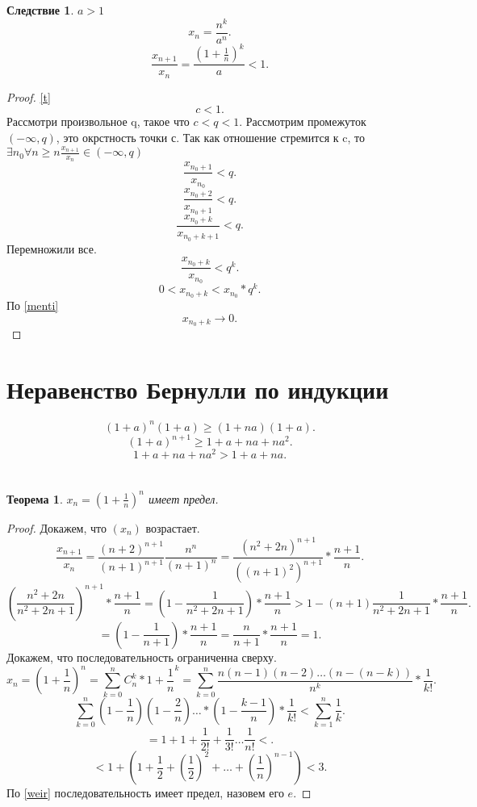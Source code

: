 \documentclass[a4paper]{scrartcl}
\newtheorem{theorem}{Теорема}
\newtheorem{corollary}{Следствие}[theorem]
\begin{document}
\begin{corollary}
	$a > 1$
	\[
		x_n = \frac{n^k}{a^n}
		.\]
	\[
		\frac{x_{n+1}}{x_n} = \frac{(1 + \frac{1}{n})^k}{a} < 1
		.\]
\end{corollary}
\begin{proof}\ref{t}
	\[
		c < 1
		.\]
	Рассмотри произвольное q, такое что $c < q < 1$. Рассмотрим промежуток  $(-\infty,q)$, это окрстность точки с. Так как отношение стремится к c, то  $\exists  n_0 \forall  n\ge n \frac{x_{n + 1}}{x_n}
		\in (-\infty,q)$
	\[
		\frac{x_{n_0 + 1}}{x_{n_0}} < q
		.\]
	\[
		\frac{x_{n_0 + 2}}{x_{n_0 + 1}} < q
		.\]
	\[
		\frac{x_{n_0 + k}}{x_{n_0 + k + 1}} < q
		.\]
	Перемножили все.
	\[
		\frac{x_{n_0 + k}}{x_{n_0}} < q^k
		.\]
	\[
		0 <  x_{n_0 + k} < x_{n_0} * q^k
		.\]
	По \ref{menti}
	\[
		x_{n_0 + k} \to 0
		.\]
\end{proof}
\section{Неравенство Бернулли по индукции} \label{ber}
\[
	(1 + a)^n (1 + a) \ge (1 +na)(1 + a)
	.\]
\[
	(1 + a)^{n + 1} \ge  1 + a + na + na^2
	.\]
\[
	1 + a + na + na^2 > 1 + a + na
	.\]
\section{}
\begin{theorem}
	$x_n  = (1 + \frac{1}{n})^n$ имеет предел.
\end{theorem}
\begin{proof}
	Докажем, что $( x_n )$ возрастает.
	\[
		\frac{x_{n + 1}}{x_n} = \frac{(n + 2)^{n + 1}}{(n + 1)^{n + 1}} \frac{n^n}{(n + 1)^{n}}=
		\frac{(n^2 + 2n)^{n + 1}}{( (n + 1)^2 )^{n + 1}} * \frac{n + 1}{n}
		.\]
	\[
		(\frac{n^2 + 2n}{n^2 + 2n + 1})^{n + 1} * \frac{n + 1}{n} =
		(1 - \frac{1}{n^2 + 2n + 1}) * \frac{n+1}{n} > 1 - (n + 1) \frac{1}{n^2+2n +1} * \frac{n+1}{n}
		.\]
	\[
		= ( 1 - \frac{1}{n + 1}) * \frac{n + 1}{n} = \frac{n}{n+1} * \frac{n + 1}{n} = 1
		.\]
	Докажем, что последовательность ограниченна сверху.
	\[
		x_n = (1 + \frac{1}{n})^n = \sum_{k=0}^{n} C_{n}^k *1 + \frac{1}{n}^k =
		\sum_{k = 0}^{n} \frac{n (n - 1) (n -2) \dots (n - (n - k))}{n^k} * \frac{1}{k!}
		.\]
	\[
		\sum_{k=0}^{n} (1 - \frac{1}{n}) (1 - \frac{2}{n}) \dots * (1-  \frac{k - 1}{n})*\frac{1}{k!} < \sum_{k = 1}^{n} \frac{1}{k}
		.\]
	\[
		= 1 + 1 + \frac{1}{2!} + \frac{1}{3!} \dots \frac{1}{n!} <
		.\]
	\[
		< 1 + (1 + \frac{1}{2} + (\frac{1}{2})^2 + \dots + (\frac{1}{n})^{n -1}) < 3
		.\]
	По \ref{weir} последовательность имеет предел, назовем его $e$.
\end{proof}
\end{document}

